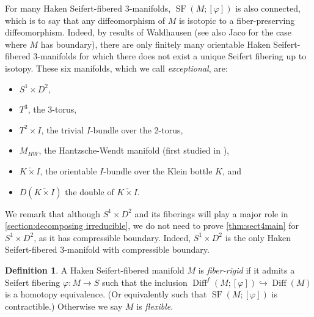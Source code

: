 \documentclass{amsart}
\theoremstyle{plain}
\theoremstyle{definition}
\newtheorem{defn}[thm]{Definition}
\DeclareMathOperator\Diff{Diff}
\DeclareMathOperator{\SF}{SF}
\newcommand{\Kx}{K\widetilde{\times}I}
\begin{document}
For many Haken Seifert-fibered 3-manifolds, $\SF(M;[\varphi])$ is also connected, which is to say that any diffeomorphism of $M$ is isotopic to a fiber-preserving diffeomorphism. 
Indeed, by results of Waldhausen \cite[Theorem 10.1]{Waldhausen67} (see also Jaco \cite[Theorem VI.18]{Jaco1980} for the case where $M$ has boundary), there are only finitely many orientable Haken Seifert-fibered 3-manifolds for which there does not exist a unique Seifert fibering up to isotopy. These six manifolds, which we call \emph{exceptional}, are:
\begin{itemize}
\item $S^1\times D^2$,
\item $T^3$, the 3-torus,
\item $T^2\times I$, the trivial $I$-bundle over the 2-torus,
\item $M_{HW}$, the Hantzsche-Wendt manifold (first studied in \cite{HantzscheWendt}),
\item $\Kx$, the orientable $I$-bundle over the Klein bottle $K$, and 
\item $D(\Kx)$ the double of $\Kx$.
\end{itemize}
We remark that although $S^1\times D^2$ and its fiberings will play a major role in \cref{section:decomposing irreducible}, we do not need to prove \cref{thm:sect4main} for $S^1\times D^2$, as it has compressible boundary. Indeed, $S^1\times D^2$ is the only Haken Seifert-fibered 3-manifold with compressible boundary.

\begin{defn}\label{def:fiberrigid-flexible}
    A Haken Seifert-fibered manifold $M$ is \emph{fiber-rigid} if it admits a Seifert fibering $\varphi\colon M\rightarrow S$ such that the inclusion $\Diff^f(M;[\varphi])\hookrightarrow \Diff(M)$ is a homotopy equivalence.
    (Or equivalently such that $\SF(M; [\varphi])$ is contractible.)
    Otherwise we say $M$ is \emph{flexible}.
\end{defn}
\end{document}

